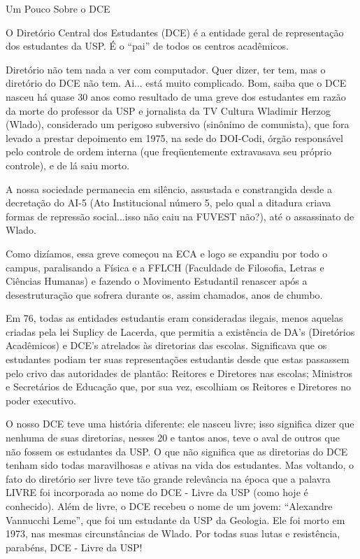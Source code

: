 \begin{secao}{Um Pouco Sobre o DCE}

O Diretório Central dos Estudantes (DCE) é a entidade geral de representação
dos estudantes da USP. É o ``pai'' de todos os centros acadêmicos.

Diretório não tem nada a ver com computador. Quer dizer, ter tem, mas o
diretório do DCE não tem. Ai... está muito complicado. Bom, saiba que o DCE
nasceu há quase 30 anos como resultado de uma greve dos estudantes em
razão da morte do professor da USP e jornalista da TV Cultura Wladimir Herzog
(Wlado), considerado um perigoso subversivo (sinônimo de comunista), que fora
levado a prestar depoimento em 1975, na sede do DOI-Codi, órgão responsável
pelo controle de ordem interna (que freqüentemente extravasava seu próprio
controle), e de lá saiu morto.

A nossa sociedade permanecia em silêncio, assustada e constrangida desde a
decretação do AI-5 (Ato Institucional número 5, pelo qual a ditadura criava
formas de repressão social...isso não caiu na FUVEST não?), até o assassinato
de Wlado.

Como dizíamos, essa greve começou na ECA e logo se expandiu por todo o  campus,
paralisando a Física e a FFLCH (Faculdade de Filosofia, Letras e Ciências
Humanas) e fazendo o Movimento Estudantil renascer após a desestruturação que
sofrera durante os, assim chamados, anos de chumbo.

Em 76, todas as entidades estudantis eram consideradas ilegais, menos aquelas
criadas pela lei Suplicy de Lacerda, que permitia a existência de DA's
(Diretórios Acadêmicos) e DCE's atrelados às diretorias das escolas.
Significava que os estudantes podiam ter suas representações estudantis desde
que estas passassem pelo crivo das autoridades de plantão: Reitores e
Diretores nas escolas; Ministros e Secretários de Educação que, por sua vez,
escolhiam os Reitores e Diretores no poder executivo.

O nosso DCE teve uma história diferente: ele nasceu livre; isso significa dizer
que nenhuma de suas diretorias, nesses 20 e tantos anos, teve o aval de outros
que não fossem os estudantes da USP. O que não significa que as diretorias do
DCE tenham sido todas maravilhosas e ativas na vida dos estudantes. Mas 
voltando, o fato do diretório ser livre teve tão grande relevância na época
que a palavra LIVRE foi incorporada ao nome do DCE - Livre da USP (como hoje é
conhecido). Além de livre, o DCE recebeu o nome de um jovem:
``Alexandre Vannucchi Leme'', que foi um estudante da USP da Geologia. Ele foi
morto em 1973, nas mesmas circunstâncias de Wlado. Por todas suas lutas e
resistência, parabéns, DCE - Livre da USP!

\end{secao}
